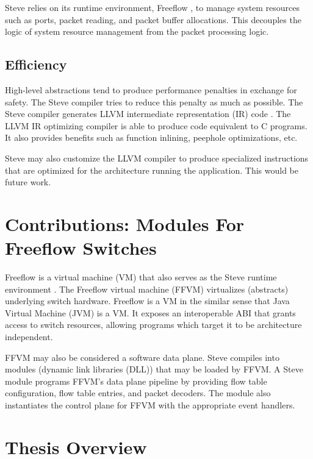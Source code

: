 Steve relies on its runtime environment, Freeflow \cite{freeflow_software}, 
to manage system resources such as
ports, packet reading, and packet buffer allocations.
This decouples the logic of system resource management from the packet
processing logic.

\subsection{Efficiency}


High-level abstractions tend to produce performance penalties in exchange
for safety. The Steve compiler tries to reduce this penalty as much as possible.
The Steve compiler generates LLVM intermediate representation (IR) code
\cite{llvm_webpage}. The LLVM IR optimizing compiler is able to produce 
code equivalent to C programs. It also provides benefits such as
function inlining, peephole optimizations, etc.

Steve may also customize the LLVM compiler to produce
specialized instructions that are optimized for the architecture running
the application. This would be future work.

\section{Contributions: Modules For Freeflow Switches}

Freeflow is a virtual machine (VM) that also serves as the Steve runtime
environment \cite{freeflow_software}.
The Freeflow virtual machine (FFVM) virtualizes (abstracts) underlying switch
hardware. 
Freeflow is a VM in the similar sense that Java Virtual Machine (JVM) is a VM. 
It exposes an interoperable ABI that grants access to switch resources,
allowing programs which target it to be architecture independent.

FFVM may also be considered a software data plane.
Steve compiles into modules (dynamic link libraries (DLL)) that may be loaded by FFVM.
A Steve module programs FFVM's data plane pipeline by providing
flow table configuration, flow table entries, and packet decoders.
The module also instantiates the control plane for FFVM with the appropriate
event handlers.

\section{Thesis Overview}


